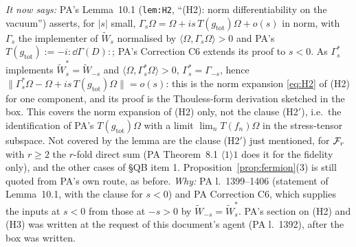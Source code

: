 \documentclass[11pt]{article}
\newcommand{\Om}{\Omega}
\newcommand{\Wt}{\widetilde W}
\newcommand{\ip}[2]{\langle#1,#2\rangle}
\newcommand{\norm}[1]{\lVert#1\rVert}
\newcommand{\gtot}{g_{\mathrm{tot}}}
\begin{document}
\begin{enumerate}[leftmargin=1.8em,label=\textbf{C\arabic*},ref=C\arabic*]
 \emph{It now says:} PA's Lemma~10.1 (\texttt{lem:H2}, ``(H2): norm differentiability on the
 vacuum'') asserts, for $|s|$ small, $\Gamma_s\Om=\Om+is\,T(\gtot)\Om+o(s)$ in norm, with $\Gamma_s$
 the implementer of $\Wt_s$ normalised by $\ip\Om{\Gamma_s\Om}>0$ and PA's
 $T(\gtot):=-i\!:\!\dd\Gamma(D)\!:$; PA's Correction C6 extends its proof to $s<0$.  As $\Gamma_s^*$
 implements $\Wt_s^*=\Wt_{-s}$ and $\ip\Om{\Gamma_s^*\Om}>0$, $\Gamma_s^*=\Gamma_{-s}$, hence
 $\norm{\Gamma_s^*\Om-\Om+is\,T(\gtot)\Om}=o(s)$: this is the norm expansion \eqref{eq:H2} of (H2) for one component, and its proof is
 the Thouless-form derivation sketched in the box.  This covers the norm expansion of (H2) only,
 not the clause (H2$'$), i.e.\ the identification of PA's $T(\gtot)\Om$ with a limit
 $\lim_nT(f_n)\Om$ in the stress-tensor subspace.  Not covered by the lemma are the clause (H2$'$) just
 mentioned, for $\mathcal F_r$ with $r\ge2$ the $r$-fold direct sum (PA Theorem~8.1 $\langle1\rangle1$ does it
 for the fidelity only), and the other cases of \S QB item 1.  Proposition~\ref{prop:fermion}(3)
 is still quoted from PA's own route, as before.
 \emph{Why:} PA l.~1399--1406 (statement of Lemma~10.1, with the clause for $s<0$) and PA
 Correction C6, which supplies the inputs at $s<0$ from those at $-s>0$ by $\Wt_{-s}=\Wt_s^*$.  PA's
 section on (H2) and (H3) was written at the request of this document's agent (PA l.~1392), after
 the box was written.
\end{enumerate}
\end{document}
